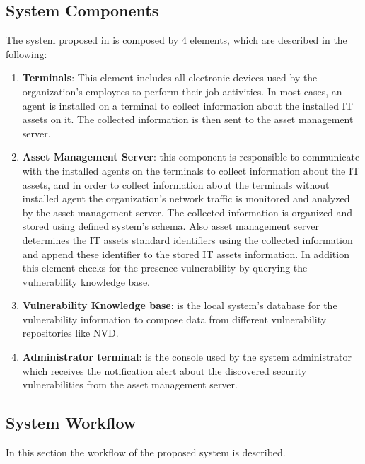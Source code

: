 \documentclass{llncs}
\begin{document}
\subsection{System Components}

\par The system proposed in \cite{paper1} is composed by 4 elements, which are described in the following:


 \begin{enumerate}
 \item \textbf{Terminals}: This element includes all electronic devices used by the organization's employees to perform their job activities. In most cases, an agent is installed on a terminal to collect information about the installed IT assets on it. The collected information is then sent to the asset management server.
 
 \item \textbf{Asset Management Server}: this component is responsible to communicate with the installed agents on the terminals to collect information about the IT assets, and  in order to collect information about the terminals without installed agent the organization's network traffic is monitored and analyzed by the asset management server. The collected information is organized and stored using defined system's schema. Also asset management server determines the IT assets standard identifiers using the collected information and append these identifier to the stored IT assets information. In addition this element checks for the presence vulnerability by querying the vulnerability knowledge base.
 
 \item \textbf{Vulnerability Knowledge base}: is the local system's database for the vulnerability information to compose data from different vulnerability repositories like NVD.
 
 
  \item \textbf{Administrator terminal}: is the console used by the system administrator which receives the notification alert about the discovered security vulnerabilities from the asset management server.     
 \end{enumerate}
 
 \newpage
\subsection{System Workflow}

\par In this section the workflow of the proposed system is described.
 
\end{document}
